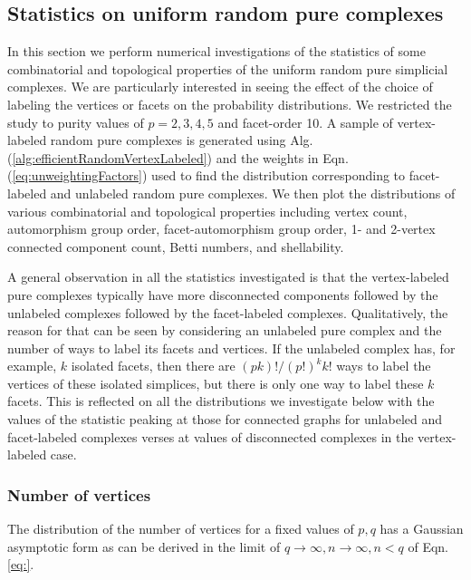 \documentclass[12pt]{article}
\theoremstyle{plain}
\theoremstyle{definition}
\theoremstyle{remark}
\begin{document}
{\color{red}{\bf CONTINUE FROM HERE}}


\subsection{Statistics on uniform random pure complexes}

In this section we perform numerical investigations of the statistics of some combinatorial and topological properties of the uniform random pure simplicial complexes. We are particularly interested in seeing the effect of the choice of labeling the vertices or facets on the probability distributions. We restricted the study to purity values of $p=2,3,4,5$ and facet-order 10. A sample of vertex-labeled random pure complexes is generated using Alg. (\ref{alg:efficientRandomVertexLabeled}) and the weights in Eqn. (\ref{eq:unweightingFactors}) used to find the distribution corresponding to facet-labeled and unlabeled random pure complexes. We then plot the distributions of various combinatorial and topological properties including vertex count,  automorphism group order, facet-automorphism group order, 1- and 2-vertex connected component count, Betti numbers, and shellability.

A general observation in all the statistics investigated is that the vertex-labeled pure complexes typically have more disconnected components followed by the unlabeled complexes followed by the facet-labeled complexes. Qualitatively, the reason for that can be seen by considering an unlabeled pure complex and the number of ways to label its facets and vertices. If the unlabeled complex has, for example, $k$ isolated facets, then there are $(pk)!/(p!)^k k!$ ways to label the vertices of these isolated simplices, but there is only one way to label these $k$ facets. This is reflected on all the distributions we investigate below with the values of the statistic peaking at those for connected graphs for unlabeled and facet-labeled complexes verses at values of disconnected complexes in the vertex-labeled case.

\subsubsection{Number of vertices}
The distribution of the number of vertices for a fixed values of $p,q$ has a Gaussian asymptotic form as can be derived in the limit of $q\rightarrow \infty, n\rightarrow\infty, n<q$ of Eqn.\ref{eq:}.
\begin{align}
    
\end{align}
    
\end{document}
